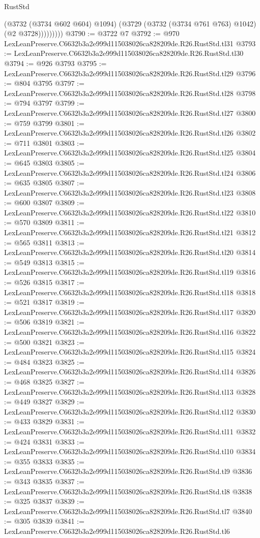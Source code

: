 \begin{lexlean}{RustStd}
\begin{coremodule}
                  (@3732 (@3734 @602 @604) @1094)
                  (@3729 (@3732 (@3734 @761 @763) @1042) (@2 @3728)))))))))
@3790 := @3722 @7
@3792 := @970 LexLeanPreserve.C6632b3a2e999d115038026ca828209de.R26.RustStd.tl31
@3793 := LexLeanPreserve.C6632b3a2e999d115038026ca828209de.R26.RustStd.tl30
@3794 := @926 @3793
@3795 := LexLeanPreserve.C6632b3a2e999d115038026ca828209de.R26.RustStd.tl29
@3796 := @804 @3795
@3797 := LexLeanPreserve.C6632b3a2e999d115038026ca828209de.R26.RustStd.tl28
@3798 := @794 @3797
@3799 := LexLeanPreserve.C6632b3a2e999d115038026ca828209de.R26.RustStd.tl27
@3800 := @759 @3799
@3801 := LexLeanPreserve.C6632b3a2e999d115038026ca828209de.R26.RustStd.tl26
@3802 := @711 @3801
@3803 := LexLeanPreserve.C6632b3a2e999d115038026ca828209de.R26.RustStd.tl25
@3804 := @645 @3803
@3805 := LexLeanPreserve.C6632b3a2e999d115038026ca828209de.R26.RustStd.tl24
@3806 := @635 @3805
@3807 := LexLeanPreserve.C6632b3a2e999d115038026ca828209de.R26.RustStd.tl23
@3808 := @600 @3807
@3809 := LexLeanPreserve.C6632b3a2e999d115038026ca828209de.R26.RustStd.tl22
@3810 := @570 @3809
@3811 := LexLeanPreserve.C6632b3a2e999d115038026ca828209de.R26.RustStd.tl21
@3812 := @565 @3811
@3813 := LexLeanPreserve.C6632b3a2e999d115038026ca828209de.R26.RustStd.tl20
@3814 := @549 @3813
@3815 := LexLeanPreserve.C6632b3a2e999d115038026ca828209de.R26.RustStd.tl19
@3816 := @526 @3815
@3817 := LexLeanPreserve.C6632b3a2e999d115038026ca828209de.R26.RustStd.tl18
@3818 := @521 @3817
@3819 := LexLeanPreserve.C6632b3a2e999d115038026ca828209de.R26.RustStd.tl17
@3820 := @506 @3819
@3821 := LexLeanPreserve.C6632b3a2e999d115038026ca828209de.R26.RustStd.tl16
@3822 := @500 @3821
@3823 := LexLeanPreserve.C6632b3a2e999d115038026ca828209de.R26.RustStd.tl15
@3824 := @484 @3823
@3825 := LexLeanPreserve.C6632b3a2e999d115038026ca828209de.R26.RustStd.tl14
@3826 := @468 @3825
@3827 := LexLeanPreserve.C6632b3a2e999d115038026ca828209de.R26.RustStd.tl13
@3828 := @449 @3827
@3829 := LexLeanPreserve.C6632b3a2e999d115038026ca828209de.R26.RustStd.tl12
@3830 := @433 @3829
@3831 := LexLeanPreserve.C6632b3a2e999d115038026ca828209de.R26.RustStd.tl11
@3832 := @424 @3831
@3833 := LexLeanPreserve.C6632b3a2e999d115038026ca828209de.R26.RustStd.tl10
@3834 := @355 @3833
@3835 := LexLeanPreserve.C6632b3a2e999d115038026ca828209de.R26.RustStd.tl9
@3836 := @343 @3835
@3837 := LexLeanPreserve.C6632b3a2e999d115038026ca828209de.R26.RustStd.tl8
@3838 := @325 @3837
@3839 := LexLeanPreserve.C6632b3a2e999d115038026ca828209de.R26.RustStd.tl7
@3840 := @305 @3839
@3841 := LexLeanPreserve.C6632b3a2e999d115038026ca828209de.R26.RustStd.tl6

\end{coremodule}
\end{lexlean}
